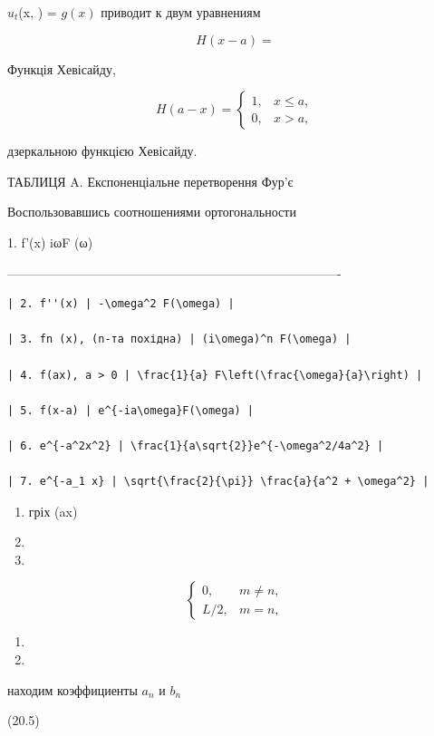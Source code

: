 \documentclass[
  ukrainian,
]{article}
\providecommand{\tightlist}{%
  \setlength{\itemsep}{0pt}\setlength{\parskip}{0pt}}
\begin{document}
\(u_t\)(x, \theta) = \(g(x)\) приводит к двум уравнениям

\[
H(x-a) =
\]

Функція Хевісайду,

\[
H(a-x) = \begin{cases} 1, & x \leqslant a, \\ 0, & x > a, \end{cases}
\]

дзеркальною функцією Хевісайду.

ТАБЛИЦЯ A. Експоненціальне перетворення Фур'є

Воспользовавшись соотношениями ортогональности

1. f'(x) \textbar{} iωF (ω) \textbar{}

\textbar------------------------------\textbar-------------------------------------------------\textbar{}

\begin{verbatim}
| 2. f''(x) | -\omega^2 F(\omega) |

| 3. fn (x), (n-та похідна) | (i\omega)^n F(\omega) |

| 4. f(ax), a > 0 | \frac{1}{a} F\left(\frac{\omega}{a}\right) |

| 5. f(x-a) | e^{-ia\omega}F(\omega) |

| 6. e^{-a^2x^2} | \frac{1}{a\sqrt{2}}e^{-\omega^2/4a^2} |

| 7. e^{-a_1 x} | \sqrt{\frac{2}{\pi}} \frac{a}{a^2 + \omega^2} |
\end{verbatim}

\begin{enumerate}
\def\labelenumi{\arabic{enumi}.}
\setcounter{enumi}{19}
\item
  гріх (ax)
\item
\item
\end{enumerate}

\[
\begin{cases} 0, & m \neq n, \\ L/2, & m = n, \end{cases}
\]

\begin{enumerate}
\def\labelenumi{\arabic{enumi}.}
\setcounter{enumi}{9}
\tightlist
\item
\item
\end{enumerate}

находим коэффициенты \(a_n\) и \(b_n\)

(20.5)
\end{document}
